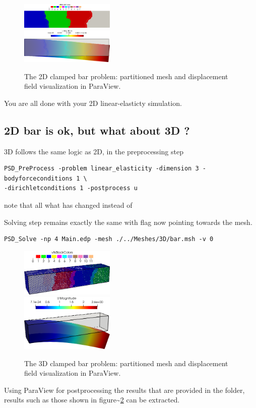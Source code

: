 \begin{figure}[h!]
\centering
\includegraphics[width=0.4\textwidth]{./Images/le-2d-bar-partioned.png}\\
\includegraphics[width=0.4\textwidth]{./Images/le-2d-bar-results.png}
\caption{The 2D clamped bar problem: partitioned mesh and displacement field visualization in ParaView. \label{bar-le-full}}
\end{figure}

You are all done with your 2D linear-elasticty simulation.

\subsection{2D bar is ok, but what about 3D ?}

3D follows the same logic as 2D, in the preprocessing step

\begin{lstlisting}[style=BashInputStyle]
PSD_PreProcess -problem linear_elasticity -dimension 3 -bodyforceconditions 1 \
-dirichletconditions 1 -postprocess u
\end{lstlisting}

note that all what has changed  instead of

Solving step remains exactly the same with  flag now pointing
towards the \psd{3D} mesh.

\begin{lstlisting}[style=BashInputStyle]
PSD_Solve -np 4 Main.edp -mesh ./../Meshes/3D/bar.msh -v 0
\end{lstlisting}

\begin{figure}[h!]
\centering
\includegraphics[width=0.4\textwidth]{./Images/le-3d-bar-clamped-ends.png}\\
\includegraphics[width=0.4\textwidth]{./Images/le-3d-bar-clamped-pulled-partioned.png}
\caption{The 3D clamped bar problem: partitioned mesh and displacement field visualization in ParaView. \label{3dbar-le-full}}
\end{figure}

Using ParaView for postprocessing the results that are provided in the
\psd{VTUs...} folder, results such as those shown in
figure\textasciitilde{}\ref{3dbar-le-full} can be extracted.
